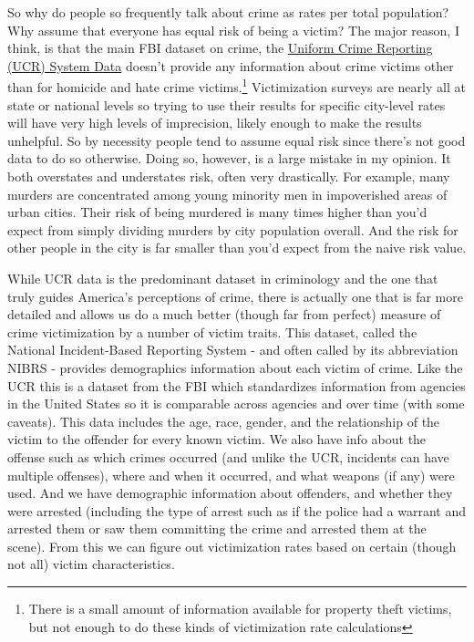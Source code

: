 \documentclass[
  12pt,
  openany]{book}
\begin{document}
So why do people so frequently talk about crime as rates per total population? Why assume that everyone has equal risk of being a victim? The major reason, I think, is that the main FBI dataset on crime, the \href{https://ucrbook.com/}{Uniform Crime Reporting (UCR) System Data} doesn't provide any information about crime victims other than for homicide and hate crime victims.\footnote{There is a small amount of information available for property theft victims, but not enough to do these kinds of victimization rate calculations} Victimization surveys are nearly all at state or national levels so trying to use their results for specific city-level rates will have very high levels of imprecision, likely enough to make the results unhelpful. So by necessity people tend to assume equal risk since there's not good data to do so otherwise. Doing so, however, is a large mistake in my opinion. It both overstates and understates risk, often very drastically. For example, many murders are concentrated among young minority men in impoverished areas of urban cities. Their risk of being murdered is many times higher than you'd expect from simply dividing murders by city population overall. And the risk for other people in the city is far smaller than you'd expect from the naive risk value.

While UCR data is the predominant dataset in criminology and the one that truly guides America's perceptions of crime, there is actually one that is far more detailed and allows us do a much better (though far from perfect) measure of crime victimization by a number of victim traits. This dataset, called the National Incident-Based Reporting System - and often called by its abbreviation NIBRS - provides demographics information about each victim of crime. Like the UCR this is a dataset from the FBI which standardizes information from agencies in the United States so it is comparable across agencies and over time (with some caveats). This data includes the age, race, gender, and the relationship of the victim to the offender for every known victim. We also have info about the offense such as which crimes occurred (and unlike the UCR, incidents can have multiple offenses), where and when it occurred, and what weapons (if any) were used. And we have demographic information about offenders, and whether they were arrested (including the type of arrest such as if the police had a warrant and arrested them or saw them committing the crime and arrested them at the scene). From this we can figure out victimization rates based on certain (though not all) victim characteristics.
\end{document}
